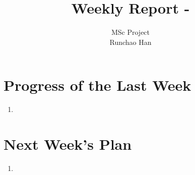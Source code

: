 \documentclass[11pt]{article}
\begin{document}
\title{Weekly Report - }
\author{MSc Project \\
Runchao Han \\
}
\maketitle


\section{Progress of the Last Week}

\begin{enumerate}
\item 
\end{enumerate}

\section{}

%
%
\section{Next Week's Plan}
\begin{enumerate}
\item 
\end{enumerate}


%
%
\end{document}
